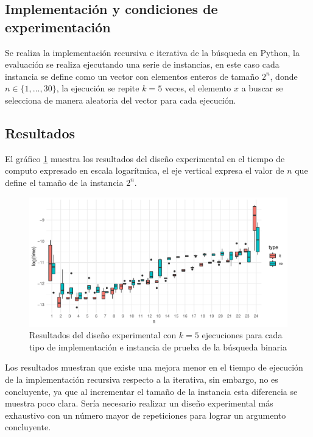 \documentclass[letterpaper,11pt]{article}
\begin{document}
\subsection{Implementación y condiciones de experimentación}
Se realiza la implementación recursiva e iterativa de la búsqueda en Python, la evaluación se realiza ejecutando una serie de instancias, en este caso cada instancia se define como un vector con elementos enteros de tamaño ${2^n}$, donde $n\in \{1,\dots,30\}$, la ejecución se repite $k=5$ veces, el elemento $x$ a buscar se selecciona de manera aleatoria del vector para cada ejecución.

\subsection{Resultados}
El gráfico \ref{fig:bs} muestra los resultados del diseño experimental en el tiempo de computo expresado en escala logarítmica, el eje vertical expresa el valor de $n$ que define el tamaño de la instancia ${2^n}$.

\begin{figure}[h!]
  \includegraphics[width=\linewidth]{bs.pdf}
  \caption{Resultados del diseño experimental con $k=5$ ejecuciones para cada tipo de implementación e instancia de prueba de la búsqueda binaria}
  \label{fig:bs}
\end{figure}


Los resultados muestran que existe una mejora menor en el tiempo de ejecución de la implementación recursiva respecto a la iterativa, sin embargo, no es concluyente, ya que al incrementar el tamaño de la instancia esta diferencia se muestra poco clara. Sería necesario realizar un diseño experimental más exhaustivo con un número mayor de repeticiones para lograr un argumento concluyente.
\end{document}
